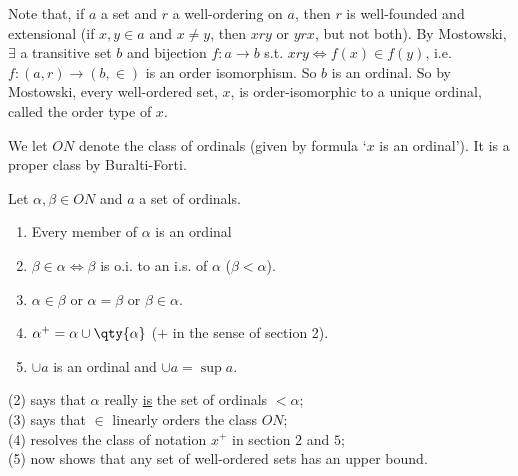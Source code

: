 Note that, if $a$ a set and $r$ a well-ordering on $a$, then $r$ is well-founded and extensional (if $x, y \in a$ and $x \neq y$, then $xry$ or $yrx$, but not both).
By Mostowski, $\exists$ a transitive set $b$ and bijection $f : a \to b$ s.t. $x r y \iff f(x) \in f(y)$, i.e. $f: (a, r) \to (b, \in)$ is an order isomorphism.
So $b$ is an ordinal.
So by Mostowski, every well-ordered set, $x$, is order-isomorphic to a unique ordinal, called the order type of $x$.

We let $ON$ denote the class of ordinals (given by formula `$x$ is an ordinal').
It is a proper class by Buralti-Forti.

\begin{proposition}
    Let $\alpha, \beta \in ON$ and $a$ a set of ordinals.
    \begin{enumerate}
        \item Every member of $\alpha$ is an ordinal
        \item $\beta \in \alpha \iff \beta$ is o.i. to an i.s. of $\alpha$ ($\beta < \alpha$).
        \item $\alpha \in \beta$ or $\alpha = \beta$ or $\beta \in \alpha$.
        \item $\alpha^+ = \alpha \cup \qty{\alpha}$ ($+$ in the sense of section 2).
        \item $\cup a$ is an ordinal and $\cup a = \sup a$.
    \end{enumerate}
\end{proposition}

\begin{remark}
    (2) says that $\alpha$ really \underline{is} the set of ordinals $< \alpha$; \\
    (3) says that $\in$ linearly orders the class $ON$; \\
    (4) resolves the class of notation $x^+$ in section $2$ and $5$; \\
    (5) now shows that any set of well-ordered sets has an upper bound.
\end{remark}

